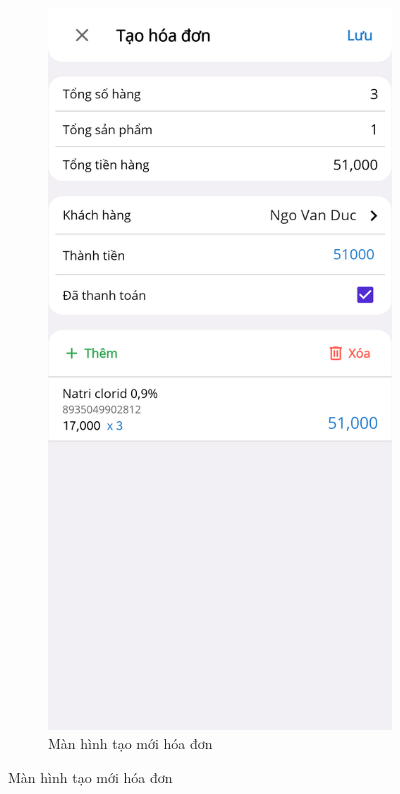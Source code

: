 \documentclass[../DoAn.tex]{subfiles}
\begin{document}
\begin{figure}[H]
    \begin{subfigure}{0.49\linewidth}
        \centering
        \includegraphics[width=0.9\linewidth]{Hinhve/design/screens/InvoiceCreatePage}
        \caption{Màn hình tạo mới hóa đơn}
        \label{figure:screen-invoicecreatepage}
    \end{subfigure}

\end{figure}
\end{document}
